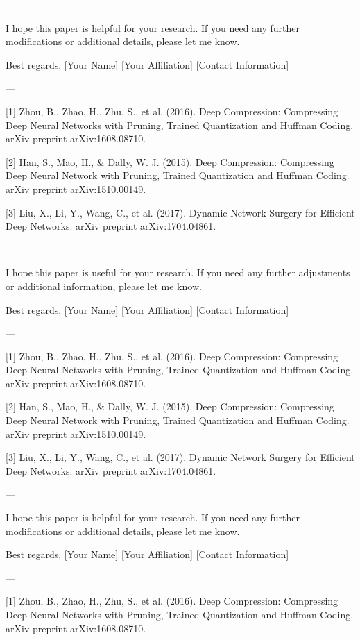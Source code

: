 ---

I hope this paper is helpful for your research. If you need any further modifications or additional details, please let me know. 

Best regards,  
[Your Name]  
[Your Affiliation]  
[Contact Information]  

---

[1] Zhou, B., Zhao, H., Zhu, S., et al. (2016). Deep Compression: Compressing Deep Neural Networks with Pruning, Trained Quantization and Huffman Coding. arXiv preprint arXiv:1608.08710.

[2] Han, S., Mao, H., & Dally, W. J. (2015). Deep Compression: Compressing Deep Neural Network with Pruning, Trained Quantization and Huffman Coding. arXiv preprint arXiv:1510.00149.

[3] Liu, X., Li, Y., Wang, C., et al. (2017). Dynamic Network Surgery for Efficient Deep Networks. arXiv preprint arXiv:1704.04861. 

---

I hope this paper is useful for your research. If you need any further adjustments or additional information, please let me know. 

Best regards,  
[Your Name]  
[Your Affiliation]  
[Contact Information]  

---

[1] Zhou, B., Zhao, H., Zhu, S., et al. (2016). Deep Compression: Compressing Deep Neural Networks with Pruning, Trained Quantization and Huffman Coding. arXiv preprint arXiv:1608.08710.

[2] Han, S., Mao, H., & Dally, W. J. (2015). Deep Compression: Compressing Deep Neural Network with Pruning, Trained Quantization and Huffman Coding. arXiv preprint arXiv:1510.00149.

[3] Liu, X., Li, Y., Wang, C., et al. (2017). Dynamic Network Surgery for Efficient Deep Networks. arXiv preprint arXiv:1704.04861. 

---

I hope this paper is helpful for your research. If you need any further modifications or additional details, please let me know. 

Best regards,  
[Your Name]  
[Your Affiliation]  
[Contact Information]  

---

[1] Zhou, B., Zhao, H., Zhu, S., et al. (2016). Deep Compression: Compressing Deep Neural Networks with Pruning, Trained Quantization and Huffman Coding. arXiv preprint arXiv:1608.08710.

